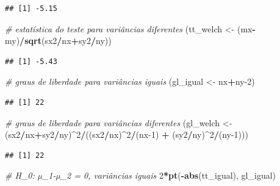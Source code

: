 \documentclass[
]{book}
\newenvironment{Shaded}{\begin{snugshade}}{\end{snugshade}}
\newcommand{\CommentTok}[1]{\textcolor[rgb]{0.56,0.35,0.01}{\textit{#1}}}
\newcommand{\DecValTok}[1]{\textcolor[rgb]{0.00,0.00,0.81}{#1}}
\newcommand{\KeywordTok}[1]{\textcolor[rgb]{0.13,0.29,0.53}{\textbf{#1}}}
\newcommand{\NormalTok}[1]{#1}
\newcommand{\OperatorTok}[1]{\textcolor[rgb]{0.81,0.36,0.00}{\textbf{#1}}}
\newcommand{\StringTok}[1]{\textcolor[rgb]{0.31,0.60,0.02}{#1}}
\theoremstyle{definition}
\theoremstyle{definition}
\theoremstyle{definition}
\theoremstyle{remark}
\begin{document}
\begin{verbatim}
## [1] -5.15
\end{verbatim}

\begin{Shaded}
\begin{Highlighting}[]
\CommentTok{\# estatística do teste para variâncias diferentes}
\NormalTok{(tt\_welch \textless{}{-}}\StringTok{ }\NormalTok{(mx}\OperatorTok{{-}}\NormalTok{my)}\OperatorTok{/}\KeywordTok{sqrt}\NormalTok{(sx2}\OperatorTok{/}\NormalTok{nx}\OperatorTok{+}\NormalTok{sy2}\OperatorTok{/}\NormalTok{ny)) }
\end{Highlighting}
\end{Shaded}

\begin{verbatim}
## [1] -5.43
\end{verbatim}

\begin{Shaded}
\begin{Highlighting}[]
\CommentTok{\# graus de liberdade para variâncias iguais}
\NormalTok{(gl\_igual \textless{}{-}}\StringTok{ }\NormalTok{nx}\OperatorTok{+}\NormalTok{ny}\DecValTok{{-}2}\NormalTok{) }
\end{Highlighting}
\end{Shaded}

\begin{verbatim}
## [1] 22
\end{verbatim}

\begin{Shaded}
\begin{Highlighting}[]
\CommentTok{\# graus de liberdade para variâncias diferentes}
\NormalTok{(gl\_welch \textless{}{-}}\StringTok{ }\NormalTok{(sx2}\OperatorTok{/}\NormalTok{nx}\OperatorTok{+}\NormalTok{sy2}\OperatorTok{/}\NormalTok{ny)}\OperatorTok{\^{}}\DecValTok{2}\OperatorTok{/}\NormalTok{((sx2}\OperatorTok{/}\NormalTok{nx)}\OperatorTok{\^{}}\DecValTok{2}\OperatorTok{/}\NormalTok{(nx}\DecValTok{{-}1}\NormalTok{) }\OperatorTok{+}\StringTok{ }\NormalTok{(sy2}\OperatorTok{/}\NormalTok{ny)}\OperatorTok{\^{}}\DecValTok{2}\OperatorTok{/}\NormalTok{(ny}\DecValTok{{-}1}\NormalTok{))) }
\end{Highlighting}
\end{Shaded}

\begin{verbatim}
## [1] 22
\end{verbatim}

\begin{Shaded}
\begin{Highlighting}[]
\CommentTok{\# H\_0: µ\_1{-}µ\_2 = 0, variâncias iguais}
\DecValTok{2}\OperatorTok{*}\KeywordTok{pt}\NormalTok{(}\OperatorTok{{-}}\KeywordTok{abs}\NormalTok{(tt\_igual), gl\_igual) }
\end{Highlighting}
\end{Shaded}
\end{document}
